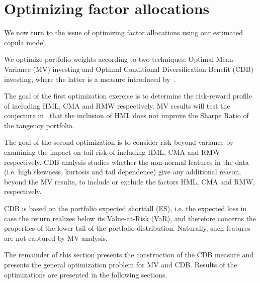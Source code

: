 
\section{Optimizing factor allocations} %
\label{sec:optimizing_factor_allocations}

We now turn to the issue of optimizing factor allocations using our estimated copula model.

We optimize portfolio weights according to two techniques: Optimal Mean-Variance (MV) investing and Optimal Conditional Diversification Benefit (CDB) investing, where the latter is a measure introduced by~\textcite{ChristoffersenErrunzaJacobLanglois2012}.

The goal of the first optimization exercise is to determine the risk-reward profile of including HML, CMA and RMW respectively. MV results will test the conjecture in~\textcite{FF2015} that the inclusion of HML does not improve the Sharpe Ratio of the tangency portfolio. 

The goal of the second optimization is to consider risk beyond variance by examining the impact on tail risk of including HML, CMA and RMW respectively. CDB analysis studies whether the non-normal features in the data (i.e. high skewness, kurtosis and tail dependence) give any additional reason, beyond the MV results, to include or exclude the factors HML, CMA and RMW, respectively.

CDB is based on the portfolio expected shortfall (ES), i.e. the expected loss in case the return realizes below its Value-at-Risk (VaR), and therefore concerns the properties of the lower tail of the portfolio distribution. Naturally, such features are not captured by MV analysis.

The remainder of this section presents the construction of the CDB measure and presents the general optimization problem for MV and CDB. Results of the optimizations are presented in the following sections.


